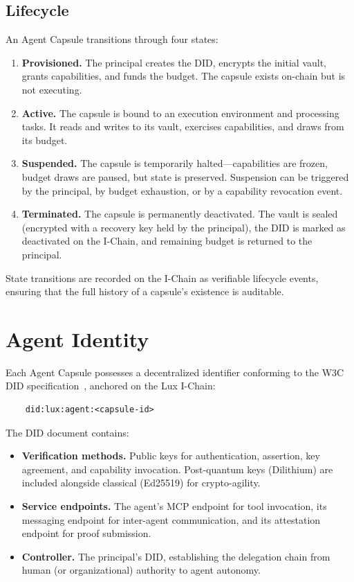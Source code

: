 \documentclass[11pt,a4paper]{article}
\begin{document}
\subsection{Lifecycle}

An Agent Capsule transitions through four states:

\begin{enumerate}
    \item \textbf{Provisioned.} The principal creates the DID, encrypts the initial vault, grants capabilities, and funds the budget. The capsule exists on-chain but is not executing.
    \item \textbf{Active.} The capsule is bound to an execution environment and processing tasks. It reads and writes to its vault, exercises capabilities, and draws from its budget.
    \item \textbf{Suspended.} The capsule is temporarily halted---capabilities are frozen, budget draws are paused, but state is preserved. Suspension can be triggered by the principal, by budget exhaustion, or by a capability revocation event.
    \item \textbf{Terminated.} The capsule is permanently deactivated. The vault is sealed (encrypted with a recovery key held by the principal), the DID is marked as deactivated on the I-Chain, and remaining budget is returned to the principal.
\end{enumerate}

State transitions are recorded on the I-Chain as verifiable lifecycle events, ensuring that the full history of a capsule's existence is auditable.

\section{Agent Identity}\label{sec:identity}

Each Agent Capsule possesses a decentralized identifier conforming to the W3C DID specification~\cite{w3c-did2022}, anchored on the Lux I-Chain:

\begin{verbatim}
    did:lux:agent:<capsule-id>
\end{verbatim}

The DID document contains:

\begin{itemize}
    \item \textbf{Verification methods.} Public keys for authentication, assertion, key agreement, and capability invocation. Post-quantum keys (Dilithium) are included alongside classical (Ed25519) for crypto-agility.
    \item \textbf{Service endpoints.} The agent's MCP endpoint for tool invocation, its messaging endpoint for inter-agent communication, and its attestation endpoint for proof submission.
    \item \textbf{Controller.} The principal's DID, establishing the delegation chain from human (or organizational) authority to agent autonomy.
\end{itemize}
\end{document}
